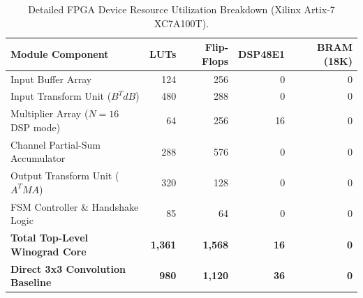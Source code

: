 \documentclass[12pt,a4paper]{article}
\begin{document}
\begin{appendices}
    \begin{table}[htbp]
        \centering
        \caption{Detailed FPGA Device Resource Utilization Breakdown (Xilinx Artix-7 XC7A100T).}
        \label{tab:detailed_util}
        \small
        \begin{tabular}{lrrrr}
            \toprule
            \textbf{Module Component}                & \textbf{LUTs}  & \textbf{Flip-Flops} & \textbf{DSP48E1} & \textbf{BRAM (18K)} \\
            \midrule
            Input Buffer Array                       & 124            & 256                 & 0                & 0                   \\
            Input Transform Unit ($B^T d B$)         & 480            & 288                 & 0                & 0                   \\
            Multiplier Array ($N=16$ DSP mode)       & 64             & 256                 & 16               & 0                   \\
            Channel Partial-Sum Accumulator          & 288            & 576                 & 0                & 0                   \\
            Output Transform Unit ($A^T M A$)        & 320            & 128                 & 0                & 0                   \\
            FSM Controller \& Handshake Logic        & 85             & 64                  & 0                & 0                   \\
            \midrule
            \textbf{Total Top-Level Winograd Core}   & \textbf{1,361} & \textbf{1,568}      & \textbf{16}      & \textbf{0}          \\
            \textbf{Direct 3x3 Convolution Baseline} & \textbf{980}   & \textbf{1,120}      & \textbf{36}      & \textbf{0}          \\
            \bottomrule
        \end{tabular}
    \end{table}

\end{appendices}
\end{document}
